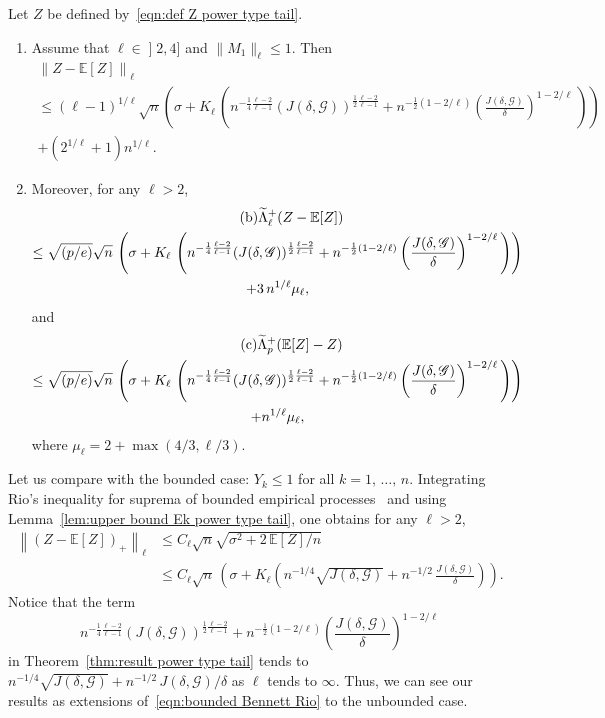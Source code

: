 \documentclass[AHL,Unicode,longabstracts,published]{cedram}
\newcommand{\bE}{\mathbb{E}}
\newcommand{\caG}{\mathscr{G}}
\newcommand{\intervalleof}[2]{\mathopen{]} #1\mathclose{}\mathpunct{},#2\mathclose{]}}
\newcommand*{\romanenumi}{\renewcommand*{\theenumi}{\roman{enumi}}}
\let\oldtilde\tilde
\renewcommand*{\tilde}[1]{\mathchoice{\widetilde{#1}}{\widetilde{#1}}{\oldtilde{#1}}{\oldtilde{#1}}}
\begin{document}
\begin{theo}\label{thm:result power type tail}
Let $Z$ be defined by~\eqref{eqn:def Z power type tail}.
\begin{enumerate}\romanenumi
\item Assume that $\ell\in\intervalleof 24$ and $\|M_1\|_\ell\leq 1$. Then
\begin{multline}\label{theo2.11.a}
\tag{$\rm a$}
\left\|Z-\bE[Z]\right\|_\ell\\
\leq(\ell-1)^{1/\ell}\sqrt{n}\left(\sigma+K_\ell\,\left(n^{-\frac 14\frac{\ell-2}{\ell-1}}(J(\delta,\caG))^{\frac 12\frac{\ell-2}{\ell-1}}+n^{-\frac 12(1-2/\ell)}\left(\frac{J(\delta,\caG)}{\delta}\right)^{1-2/\ell}\,\right)\right) \\+ \left(2^{1/\ell}+1\right)n^{1/\ell}.
\end{multline}
\item Moreover, for any $\ell>2$,
\begin{multline}\label{theo2.11.b}
\tag{$\rm b$}
\tilde\Lambda_\ell^+(Z-\bE[Z])\\
\leq \sqrt{(p/e)}\sqrt n\,\left(\sigma+K_\ell\,\left(n^{-\frac 14\frac{\ell-2}{\ell-1}}(J(\delta,\caG))^{\frac 12\frac{\ell-2}{\ell-1}}+n^{-\frac 12(1-2/\ell)}\left(\frac{J(\delta,\caG)}{\delta}\right)^{1-2/\ell}\,\right)\right)\\+3\,n^{1/\ell}\mu_\ell,
\end{multline}
and
\begin{multline}\label{theo2.11.c}
\tag{$\rm c$}
\tilde\Lambda_p^+(\bE[Z]-Z)\\
\leq \sqrt{(p/e)}\sqrt n\,\left(\sigma+K_\ell\,\left(n^{-\frac 14\frac{\ell-2}{\ell-1}}(J(\delta,\caG))^{\frac 12\frac{\ell-2}{\ell-1}}+n^{-\frac 12(1-2/\ell)}\left(\frac{J(\delta,\caG)}{\delta}\right)^{1-2/\ell}\,\right)\right)\\+n^{1/\ell}\mu_\ell,
\end{multline}
where $\mu_\ell=2+\max(4/3,\ell/3)$.
\end{enumerate}
\end{theo}

Let us compare with the bounded case: $Y_k\leq 1$ for all $k=1,\,\ldots,\,n$. Integrating Rio's inequality for suprema of bounded empirical processes~\cite[Theorem~1]{Rio02} and using Lemma~\ref{lem:upper bound Ek power type tail}, one obtains for any $\ell>2$,
\begin{align}\label{eqn:bounded Bennett Rio}
\left\|(Z-\bE[Z])_+\right\|_\ell &\leq C_\ell\sqrt n\sqrt{\sigma^2+2\,\bE[Z]/n}\\
&\leq C_\ell\sqrt n\,\left(\sigma + K_\ell\left(n^{-1/4}\sqrt{J(\delta,\caG)}+n^{-1/2}\,\frac{J(\delta,\caG)}{\delta}\right)\right).
\end{align}
Notice that the term
\[
n^{-\frac 14\frac{\ell-2}{\ell-1}}(J(\delta,\caG))^{\frac 12\frac{\ell-2}{\ell-1}}+n^{-\frac 12(1-2/\ell)}\left(\frac{J(\delta,\caG)}{\delta}\right)^{1-2/\ell}
\]
in Theorem~\ref{thm:result power type tail} tends to $n^{-1/4}\sqrt{J(\delta,\caG)}+n^{-1/2}\,J(\delta,\caG)/\delta$ as $\ell$ tends to $\infty$. Thus, we can see our results as extensions of~\eqref{eqn:bounded Bennett Rio} to the unbounded case.
\end{document}
